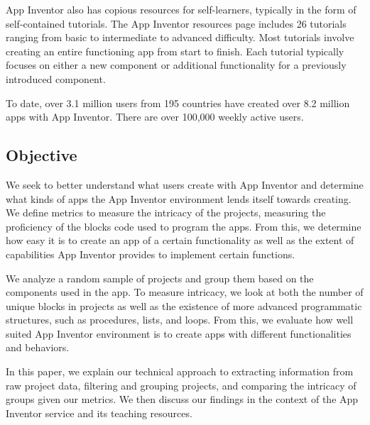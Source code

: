 \documentclass[conference]{IEEEtran}
\begin{document}
App Inventor also has copious resources for self-learners, typically in the form of self-contained tutorials. The App Inventor resources page includes 26 tutorials ranging from basic to intermediate to advanced difficulty. Most tutorials involve creating an entire functioning app from start to finish. Each tutorial typically focuses on either a new component or additional functionality for a previously introduced component.

To date, over 3.1 million users from 195 countries have created over 8.2 million apps with App Inventor. There are over 100,000 weekly active users.

\subsection{Objective}
We seek to better understand what users create with App Inventor and determine what kinds of apps the App Inventor environment lends itself towards creating. We define metrics to measure the intricacy of the projects, measuring the proficiency of the blocks code used to program the apps. From this, we determine how easy it is to create an app of a certain functionality as well as the extent of capabilities App Inventor provides to implement certain functions. 

We analyze a random sample of projects and group them based on the components used in the app. To measure intricacy, we look at both the number of unique blocks in projects as well as the existence of more advanced programmatic structures, such as procedures, lists, and loops. From this, we evaluate how well suited App Inventor environment is to create apps with different functionalities and behaviors.

In this paper, we explain our technical approach to extracting information from raw project data, filtering and grouping projects, and comparing the intricacy of groups given our metrics.  We then discuss our findings in the context of the App Inventor service and its teaching resources.
\end{document}
